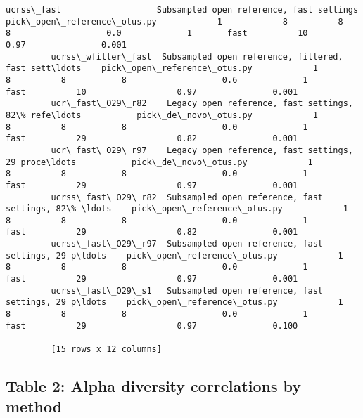 \documentclass{article}
\begin{document}
\begin{Verbatim}[commandchars=\\\{\}]
         ucrss\_fast                   Subsampled open reference, fast settings    pick\_open\_reference\_otus.py            1            8          8           8                   0.0             1       fast          10                  0.97               0.001
         ucrss\_wfilter\_fast  Subsampled open reference, filtered, fast sett\ldots    pick\_open\_reference\_otus.py            1            8          8           8                   0.6             1       fast          10                  0.97               0.001
         ucr\_fast\_O29\_r82    Legacy open reference, fast settings, 82\% refe\ldots           pick\_de\_novo\_otus.py            1            8          8           8                   0.0             1       fast          29                  0.82               0.001
         ucr\_fast\_O29\_r97    Legacy open reference, fast settings, 29 proce\ldots           pick\_de\_novo\_otus.py            1            8          8           8                   0.0             1       fast          29                  0.97               0.001
         ucrss\_fast\_O29\_r82  Subsampled open reference, fast settings, 82\% \ldots    pick\_open\_reference\_otus.py            1            8          8           8                   0.0             1       fast          29                  0.82               0.001
         ucrss\_fast\_O29\_r97  Subsampled open reference, fast settings, 29 p\ldots    pick\_open\_reference\_otus.py            1            8          8           8                   0.0             1       fast          29                  0.97               0.001
         ucrss\_fast\_O29\_s1   Subsampled open reference, fast settings, 29 p\ldots    pick\_open\_reference\_otus.py            1            8          8           8                   0.0             1       fast          29                  0.97               0.100
         
         [15 rows x 12 columns]
\end{Verbatim}
        

    \subsection{Table 2: Alpha diversity correlations by method}
\end{document}
